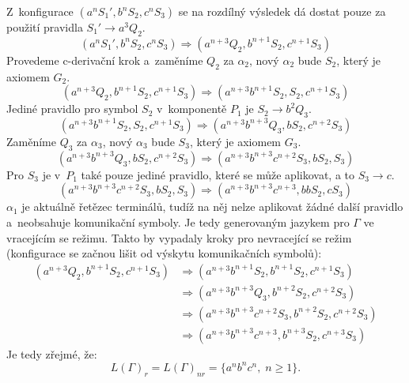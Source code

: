 \begin{example}
    Z~konfigurace $(a^nS_1', b^nS_2, c^nS_3)$ se na rozdílný výsledek dá dostat pouze za použití pravidla $S_1' \rightarrow a^3Q_2$.
    \begin{equation*}
        (a^nS_1', b^nS_2, c^nS_3) \Rightarrow (a^{n+3}Q_2, b^{n+1}S_2, c^{n+1}S_3)
    \end{equation*} 
    Provedeme c-derivační krok a~zaměníme $Q_2$ za $\alpha_2$, nový $\alpha_2$ bude $S_2$, který je axiomem $G_2$.
    \begin{equation*}
        (a^{n+3}Q_2, b^{n+1}S_2, c^{n+1}S_3) \Rightarrow (a^{n+3}b^{n+1}S_2, S_2, c^{n+1}S_3)
    \end{equation*}
    Jediné pravidlo pro symbol $S_2$ v~komponentě $P_1$ je $S_2 \rightarrow b^2Q_3$.
    \begin{equation*}
        (a^{n+3}b^{n+1}S_2, S_2, c^{n+1}S_3) \Rightarrow (a^{n+3}b^{n+3}Q_3, bS_2, c^{n+2}S_3)
    \end{equation*}
    Zaměníme $Q_3$ za $\alpha_3$, nový $\alpha_3$ bude $S_3$, který je axiomem $G_3$.
    \begin{equation*}
        (a^{n+3}b^{n+3}Q_3, bS_2, c^{n+2}S_3) \Rightarrow (a^{n+3}b^{n+3}c^{n+2}S_3, bS_2, S_3)
    \end{equation*}
    Pro $S_3$ je v~$P_1$ také pouze jediné pravidlo, které se může aplikovat, a to $S_3 \rightarrow c$.
    \begin{equation*}
        (a^{n+3}b^{n+3}c^{n+2}S_3, bS_2, S_3) \Rightarrow (a^{n+3}b^{n+3}c^{n+3}, bbS_2, cS_3)
    \end{equation*}
     $\alpha_1$ je aktuálně řetězec terminálů, tudíž na něj nelze aplikovat žádné další pravidlo a~neobsahuje komunikační symboly.
     Je tedy generovaným jazykem pro $\Gamma$ ve vracejícím se režimu.
     Takto by vypadaly kroky pro nevracející se režim (konfigurace se začnou lišit od výskytu komunikačních symbolů):
     \begin{align*}
        (a^{n+3}Q_2, b^{n+1}S_2, c^{n+1}S_3) &\Rightarrow (a^{n+3}b^{n+1}S_2, b^{n+1}S_2, c^{n+1}S_3) \\
        &\Rightarrow (a^{n+3}b^{n+3}Q_3, b^{n+2}S_2, c^{n+2}S_3) \\
        &\Rightarrow (a^{n+3}b^{n+3}c^{n+2}S_3, b^{n+2}S_2, c^{n+2}S_3) \\
        &\Rightarrow (a^{n+3}b^{n+3}c^{n+3}, b^{n+3}S_2, c^{n+3}S_3)
     \end{align*}
     Je tedy zřejmé, že:
     \begin{equation*}
        L(\Gamma)_r = L(\Gamma)_{nr} = \{a^nb^nc^n,\; n \geq 1\}.
     \end{equation*}
\end{example}

